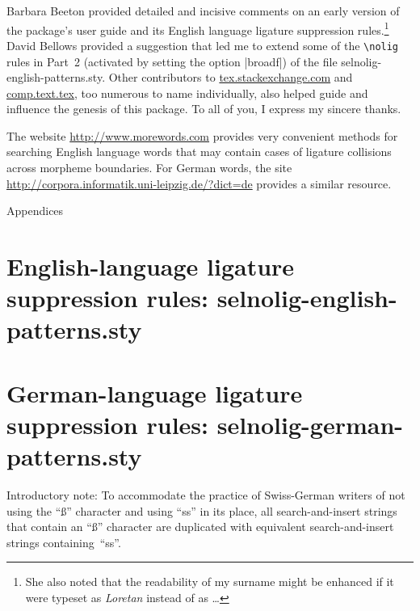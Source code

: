\documentclass[11pt]{article}
\newcommand{\pkg}[1]{\textsf{#1}}
\newcommand{\cmmd}[1]{\texttt{\textbackslash #1}}
\let\oldappendix\appendix
\renewcommand\appendix{%
   \addtocontents{toc}{\protect{\vspace{1\baselineskip}}}
   \addtocontents{toc}{\protect{\mdseries Appendices\par}}
   \noindent
   {\Large Appendices}
   \oldappendix}
\begin{document}
Barbara Beeton provided detailed and incisive comments on an early version of the package's user guide and its English language ligature suppression rules.\footnote{She also noted that the readability of my surname might be enhanced if it were typeset as \emph{Loretan} instead of as \emph{}\dots} David Bellows provided a suggestion that led me to extend some of the \cmmd{nolig} rules in Part~2 (activated by setting the option |broadf|) of the file \pkg{selnolig-english-patterns.sty}. Other contributors to \url{tex.stackexchange.com} and \url{comp.text.tex}, too numerous to name individually, also helped guide and influence the genesis of this package. To all of you, I express my sincere thanks.

The website \url{http://www.morewords.com} provides very convenient methods for searching English language words that may contain cases of ligature collisions across morpheme boundaries. For German words, the site \url{http://corpora.informatik.uni-leipzig.de/?dict=de} provides a similar resource. 


\clearpage
\appendix
\selnoligoff  %


\small %


\section[English-language ligature suppression rules: selnolig-english-patterns.sty]{English-language ligature suppression rules: 
\pkg{selnolig-english-patterns.sty}}
\label{sec:eng-listing}

\begin{multicols}{2}
\end{multicols}

\clearpage
\section[German-language ligature suppression rules:
selnolig-german-patterns.sty]{German-language ligature suppression rules: \pkg{selnolig-german-patterns.sty}}
\label{sec:germ-listing}

Introductory note: To accommodate the practice of Swiss-German writers of not using the \enquote{ß} character and using \enquote{ss} in its place, all search-and-insert strings that contain an \enquote{ß} character are duplicated with equivalent search-and-insert strings containing~\enquote{ss}.
\end{document}
